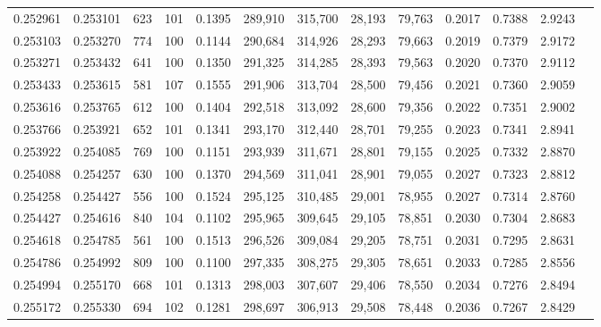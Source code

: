 \begin{tabular}{rrrrrrrrrrrrr}
0.252961 & 0.253101 &   623 & 101 &                                     0.1395 & 289,910 & 315,700 &  28,193 &  79,763 & 0.2017 & 0.7388 & 2.9243 \\
0.253103 & 0.253270 &   774 & 100 &                                     0.1144 & 290,684 & 314,926 &  28,293 &  79,663 & 0.2019 & 0.7379 & 2.9172 \\
0.253271 & 0.253432 &   641 & 100 &                                     0.1350 & 291,325 & 314,285 &  28,393 &  79,563 & 0.2020 & 0.7370 & 2.9112 \\
0.253433 & 0.253615 &   581 & 107 &                                     0.1555 & 291,906 & 313,704 &  28,500 &  79,456 & 0.2021 & 0.7360 & 2.9059 \\
0.253616 & 0.253765 &   612 & 100 &                                     0.1404 & 292,518 & 313,092 &  28,600 &  79,356 & 0.2022 & 0.7351 & 2.9002 \\
0.253766 & 0.253921 &   652 & 101 &                                     0.1341 & 293,170 & 312,440 &  28,701 &  79,255 & 0.2023 & 0.7341 & 2.8941 \\
0.253922 & 0.254085 &   769 & 100 &                                     0.1151 & 293,939 & 311,671 &  28,801 &  79,155 & 0.2025 & 0.7332 & 2.8870 \\
0.254088 & 0.254257 &   630 & 100 &                                     0.1370 & 294,569 & 311,041 &  28,901 &  79,055 & 0.2027 & 0.7323 & 2.8812 \\
0.254258 & 0.254427 &   556 & 100 &                                     0.1524 & 295,125 & 310,485 &  29,001 &  78,955 & 0.2027 & 0.7314 & 2.8760 \\
0.254427 & 0.254616 &   840 & 104 &                                     0.1102 & 295,965 & 309,645 &  29,105 &  78,851 & 0.2030 & 0.7304 & 2.8683 \\
0.254618 & 0.254785 &   561 & 100 &                                     0.1513 & 296,526 & 309,084 &  29,205 &  78,751 & 0.2031 & 0.7295 & 2.8631 \\
0.254786 & 0.254992 &   809 & 100 &                                     0.1100 & 297,335 & 308,275 &  29,305 &  78,651 & 0.2033 & 0.7285 & 2.8556 \\
0.254994 & 0.255170 &   668 & 101 &                                     0.1313 & 298,003 & 307,607 &  29,406 &  78,550 & 0.2034 & 0.7276 & 2.8494 \\
0.255172 & 0.255330 &   694 & 102 &                                     0.1281 & 298,697 & 306,913 &  29,508 &  78,448 & 0.2036 & 0.7267 & 2.8429 \\

\end{tabular}
